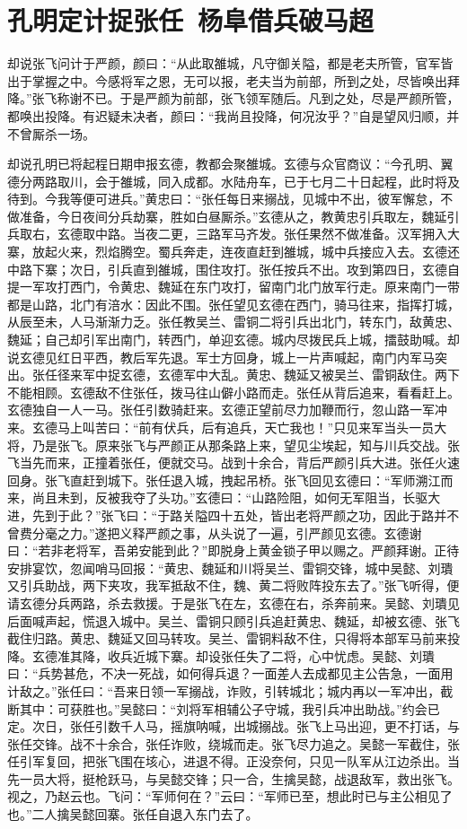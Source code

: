 \chapter{孔明定计捉张任~杨阜借兵破马超}

却说张飞问计于严颜，颜曰：“从此取雒城，凡守御关隘，都是老夫所管，官军皆出于掌握之中。今感将军之恩，无可以报，老夫当为前部，所到之处，尽皆唤出拜降。”张飞称谢不已。于是严颜为前部，张飞领军随后。凡到之处，尽是严颜所管，都唤出投降。有迟疑未决者，颜曰：“我尚且投降，何况汝乎？”自是望风归顺，并不曾厮杀一场。

却说孔明已将起程日期申报玄德，教都会聚雒城。玄德与众官商议：“今孔明、翼德分两路取川，会于雒城，同入成都。水陆舟车，已于七月二十日起程，此时将及待到。今我等便可进兵。”黄忠曰：“张任每日来搦战，见城中不出，彼军懈怠，不做准备，今日夜间分兵劫寨，胜如白昼厮杀。”玄德从之，教黄忠引兵取左，魏延引兵取右，玄德取中路。当夜二更，三路军马齐发。张任果然不做准备。汉军拥入大寨，放起火来，烈焰腾空。蜀兵奔走，连夜直赶到雒城，城中兵接应入去。玄德还中路下寨；次日，引兵直到雒城，围住攻打。张任按兵不出。攻到第四日，玄德自提一军攻打西门，令黄忠、魏延在东门攻打，留南门北门放军行走。原来南门一带都是山路，北门有涪水：因此不围。张任望见玄德在西门，骑马往来，指挥打城，从辰至未，人马渐渐力乏。张任教吴兰、雷铜二将引兵出北门，转东门，敌黄忠、魏延；自己却引军出南门，转西门，单迎玄德。城内尽拨民兵上城，擂鼓助喊。却说玄德见红日平西，教后军先退。军士方回身，城上一片声喊起，南门内军马突出。张任径来军中捉玄德，玄德军中大乱。黄忠、魏延又被吴兰、雷铜敌住。两下不能相顾。玄德敌不住张任，拨马往山僻小路而走。张任从背后追来，看看赶上。玄德独自一人一马。张任引数骑赶来。玄德正望前尽力加鞭而行，忽山路一军冲来。玄德马上叫苦曰：“前有伏兵，后有追兵，天亡我也！”只见来军当头一员大将，乃是张飞。原来张飞与严颜正从那条路上来，望见尘埃起，知与川兵交战。张飞当先而来，正撞着张任，便就交马。战到十余合，背后严颜引兵大进。张任火速回身。张飞直赶到城下。张任退入城，拽起吊桥。张飞回见玄德曰：“军师溯江而来，尚且未到，反被我夺了头功。”玄德曰：“山路险阻，如何无军阻当，长驱大进，先到于此？”张飞曰：“于路关隘四十五处，皆出老将严颜之功，因此于路并不曾费分毫之力。”遂把义释严颜之事，从头说了一遍，引严颜见玄德。玄德谢曰：“若非老将军，吾弟安能到此？”即脱身上黄金锁子甲以赐之。严颜拜谢。正待安排宴饮，忽闻哨马回报：“黄忠、魏延和川将吴兰、雷铜交锋，城中吴懿、刘璝又引兵助战，两下夹攻，我军抵敌不住，魏、黄二将败阵投东去了。”张飞听得，便请玄德分兵两路，杀去救援。于是张飞在左，玄德在右，杀奔前来。吴懿、刘璝见后面喊声起，慌退入城中。吴兰、雷铜只顾引兵追赶黄忠、魏延，却被玄德、张飞截住归路。黄忠、魏延又回马转攻。吴兰、雷铜料敌不住，只得将本部军马前来投降。玄德准其降，收兵近城下寨。却设张任失了二将，心中忧虑。吴懿、刘璝曰：“兵势甚危，不决一死战，如何得兵退？一面差人去成都见主公告急，一面用计敌之。”张任曰：“吾来日领一军搦战，诈败，引转城北；城内再以一军冲出，截断其中：可获胜也。”吴懿曰：“刘将军相辅公子守城，我引兵冲出助战。”约会已定。次日，张任引数千人马，摇旗呐喊，出城搦战。张飞上马出迎，更不打话，与张任交锋。战不十余合，张任诈败，绕城而走。张飞尽力追之。吴懿一军截住，张任引军复回，把张飞围在垓心，进退不得。正没奈何，只见一队军从江边杀出。当先一员大将，挺枪跃马，与吴懿交锋；只一合，生擒吴懿，战退敌军，救出张飞。视之，乃赵云也。飞问：“军师何在？”云曰：“军师已至，想此时已与主公相见了也。”二人擒吴懿回寨。张任自退入东门去了。

